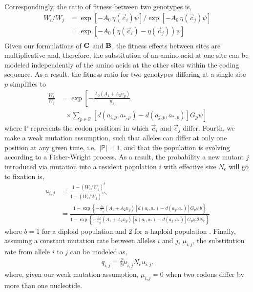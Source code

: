 \documentclass[12pt,letterpaper]{article}
\newcommand{\Cost}{\ensuremath{\text{\textbf{C}}}\xspace}
\newcommand{\Func}{\ensuremath{\text{\textbf{B}}}\xspace}
\newcommand{\Ne}{\ensuremath{{N_e}}\xspace} %
\newcommand{\aip}{\ensuremath{a_{i,p}}\xspace}
\newcommand{\ajp}{\ensuremath{a_{j,p}}\xspace}
\newcommand{\aopt}{\ensuremath{a_*}\xspace}
\newcommand{\aoptp}{\ensuremath{a_{*,p}}\xspace}
\newcommand{\cveci}{\ensuremath{\cvec_i}\xspace}
\newcommand{\cvecj}{\ensuremath{\cvec_j}\xspace}
\newcommand{\cvec}{\ensuremath{\Vec{c}}\xspace}
\newcommand{\muij}{\ensuremath{\mu_{i,j}}\xspace}
\newcommand{\setP}{\ensuremath{\mathbb{P}}\xspace}
\renewcommand{\ng}{\ensuremath{{n_g}}\xspace}
\begin{document}
Correspondingly, the ratio of fitness between two genotypes is,
\begin{align}
  W_i/W_j &=  \exp\left[- A_0 \, \eta(\cveci) \psi\right]/\exp\left[- A_0 \, \eta(\cvecj) \psi\right]\\
  &=  \exp\left[- A_0 \left(\eta(\cveci)- \eta(\cvecj)\right) \psi\right] \label{eq:Wratio}\\
\end{align}
Given our formulations of \Cost and \Func, the fitness effects between sites are multiplicative and, therefore, the substitution of an amino acid at one site can be modeled independently of the amino acids at the other sites within the coding sequence.
As a result, the fitness ratio for two genotypes differing at a single site $p$ simplifies to
\begin{align*}
  \frac{W_i}{W_j}  &= \exp\left[- \frac{A_0 \left(A_1 + A_2 \ng\right)}{\ng} \right.\\
  & \;\;\;  \left. \times \sum_{p \in \setP} \left[d\left(\aip,\aoptp\right) - d\left(\ajp,\aoptp\right)\right] G_p \psi \right]
\end{align*}
where \setP represents the codon positions in which \cveci and \cvecj differ.
Fourth, we make a weak mutation assumption, such that alleles can differ at only one position at any given time, i.e.~$|\setP| = 1$, and that the population is evolving according to a Fisher-Wright process.
As a result, the probability a new mutant $j$ introduced via mutation into a resident population $i$ with effective size \Ne will go to fixation is,
\begin{align*}
  u_{i,j} &=  \frac{1 - \left(W_i/W_j\right)^b}{1 - \left(W_i/W_j\right)^{2 \Ne}}\\
   &= \frac{1- \exp\left\{- \frac{A_0}{\ng} \left(A_1 + A_2 \ng\right) \left[d\left(a_i,\aopt\right) - d\left(a_j,\aopt\right)\right] G_p \psi \,  b\right\}}  {1-\exp\left\{- \frac{A_0}{\ng} \left(A_1 + A_2 \ng\right) \left[d\left(a_i,\aopt\right) - d\left(a_j,\aopt\right)\right] G_p \psi \, 2\Ne\right\}}
\end{align*}
where $b=1$ for a diploid population and $2$ for a haploid population \citep{Kimura1962,Wright1969,Iwasa1988,BergAndLassig2003,SellaAndHirsh2005}.
Finally, assuming a constant mutation rate between alleles $i$ and $j$, $\muij$, the substitution rate from allele $i$ to $j$ can be modeled as,
\begin{align*}
  q_{i,j} = \frac{2}{b} \muij \Ne u_{i,j}.
\end{align*}
where, given our weak mutation assumption, $\muij = 0$ when two codons differ by more than one nucleotide.
\end{document}
